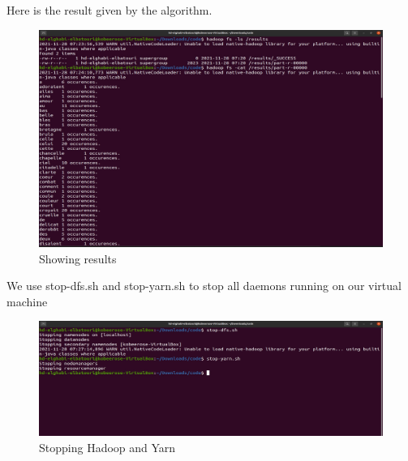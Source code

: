 \begin{spacing}{1.2}
\par Here is the result given by the algorithm.
\\
\begin{figure}[!htb] 
\begin{center} 
\includegraphics[width=1\linewidth]{Big_Data/Hadoop/1-Node Map_Reduce/Showing results} 
\end{center} 
\caption{Showing results} 
\end{figure} 
\FloatBarrier

\par We use stop-dfs.sh and stop-yarn.sh to stop all daemons running on our virtual machine
\\
\begin{figure}[!htb] 
\begin{center} 
\includegraphics[width=1\linewidth]{Big_Data/Hadoop/1-Node Map_Reduce/Stopping Hadoop and Yarn} 
\end{center} 
\caption{Stopping Hadoop and Yarn} 
\end{figure} 
\FloatBarrier


\end{spacing}